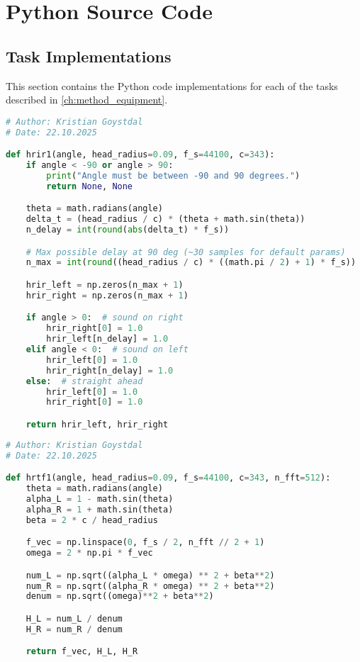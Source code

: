 \chapter{Python Source Code}

\section{Task Implementations}
This section contains the Python code implementations for each of the tasks described in \autoref{ch:method_equipment}.

\begin{lstlisting}[language=Python, caption={hrir.py}, label={lst:hrir}]
# Author: Kristian Goystdal
# Date: 22.10.2025

def hrir1(angle, head_radius=0.09, f_s=44100, c=343):
    if angle < -90 or angle > 90:
        print("Angle must be between -90 and 90 degrees.")
        return None, None

    theta = math.radians(angle)
    delta_t = (head_radius / c) * (theta + math.sin(theta))
    n_delay = int(round(abs(delta_t) * f_s))

    # Max possible delay at 90 deg (~30 samples for default params)
    n_max = int(round((head_radius / c) * ((math.pi / 2) + 1) * f_s))

    hrir_left = np.zeros(n_max + 1)
    hrir_right = np.zeros(n_max + 1)

    if angle > 0:  # sound on right
        hrir_right[0] = 1.0
        hrir_left[n_delay] = 1.0
    elif angle < 0:  # sound on left
        hrir_left[0] = 1.0
        hrir_right[n_delay] = 1.0
    else:  # straight ahead
        hrir_left[0] = 1.0
        hrir_right[0] = 1.0

    return hrir_left, hrir_right


\end{lstlisting}

\begin{lstlisting}[language=Python, caption={hrtf.py}, label={lst:hrtf}]
# Author: Kristian Goystdal
# Date: 22.10.2025

def hrtf1(angle, head_radius=0.09, f_s=44100, c=343, n_fft=512):
    theta = math.radians(angle)
    alpha_L = 1 - math.sin(theta)
    alpha_R = 1 + math.sin(theta)
    beta = 2 * c / head_radius

    f_vec = np.linspace(0, f_s / 2, n_fft // 2 + 1)
    omega = 2 * np.pi * f_vec

    num_L = np.sqrt((alpha_L * omega) ** 2 + beta**2)
    num_R = np.sqrt((alpha_R * omega) ** 2 + beta**2)
    denum = np.sqrt((omega)**2 + beta**2)

    H_L = num_L / denum
    H_R = num_R / denum

    return f_vec, H_L, H_R
\end{lstlisting}

